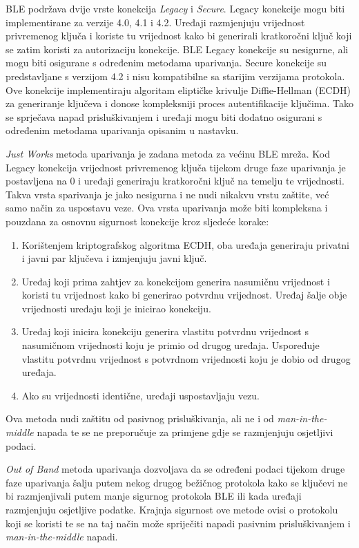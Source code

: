 \documentclass[times, utf8, diplomski]{fer}
\begin{document}
BLE podržava dvije vrste konekcija \emph{Legacy} i \emph{Secure}. Legacy konekcije mogu biti implementirane za verzije 4.0, 4.1 i 4.2. Uređaji razmjenjuju vrijednost privremenog ključa  i koriste tu vrijednost kako bi generirali kratkoročni ključ  koji se zatim koristi za autorizaciju konekcije. BLE Legacy konekcije su nesigurne, ali mogu biti osigurane s određenim metodama uparivanja. Secure konekcije su predstavljane s verzijom 4.2 i nisu kompatibilne sa starijim verzijama protokola. Ove konekcije implementiraju algoritam eliptičke krivulje Diffie-Hellman (ECDH) za generiranje ključeva i donose kompleksniji proces autentifikacije ključima. Tako se sprječava napad prisluškivanjem i uređaji mogu biti dodatno osigurani s određenim metodama uparivanja opisanim u nastavku.

\emph{Just Works} metoda uparivanja je zadana metoda za većinu BLE mreža. Kod Legacy konekcija vrijednost privremenog ključa tijekom druge faze uparivanja je postavljena na 0 i uređaji generiraju kratkoročni ključ na temelju te vrijednosti. Takva vrsta sparivanja je jako nesigurna i ne nudi nikakvu vrstu zaštite, već samo način za uspostavu veze. Ova vrsta uparivanja može biti kompleksna i pouzdana za osnovnu sigurnost konekcije kroz sljedeće korake:
\begin{enumerate}
    \item Korištenjem kriptografskog algoritma ECDH, oba uređaja generiraju privatni i javni par ključeva i izmjenjuju javni ključ.
    \item Uređaj koji prima zahtjev za konekcijom generira nasumičnu vrijednost i koristi tu vrijednost kako bi generirao potvrdnu vrijednost. Uređaj šalje obje vrijednosti uređaju koji je inicirao konekciju.
    \item Uređaj koji inicira konekciju generira vlastitu potvrdnu vrijednost s nasumičnom vrijednosti koju je primio od drugog uređaja. Uspoređuje vlastitu potvrdnu vrijednost s potvrdnom vrijednosti koju je dobio od drugog uređaja.
    \item Ako su vrijednosti identične, uređaji uspostavljaju vezu.
\end{enumerate}
Ova metoda nudi zaštitu od pasivnog prisluškivanja, ali ne i od \emph{man-in-the-middle} napada te se ne preporučuje za primjene gdje se razmjenjuju osjetljivi podaci. 

\emph{Out of Band} metoda uparivanja dozvoljava da se određeni podaci tijekom druge faze uparivanja šalju putem nekog drugog bežičnog protokola kako se ključevi ne bi razmjenjivali putem manje sigurnog protokola BLE ili kada uređaji razmjenjuju osjetljive podatke. Krajnja sigurnost ove metode ovisi o protokolu koji se koristi te se na taj način može spriječiti napadi pasivnim prisluškivanjem i \emph{man-in-the-middle} napadi.
\end{document}
